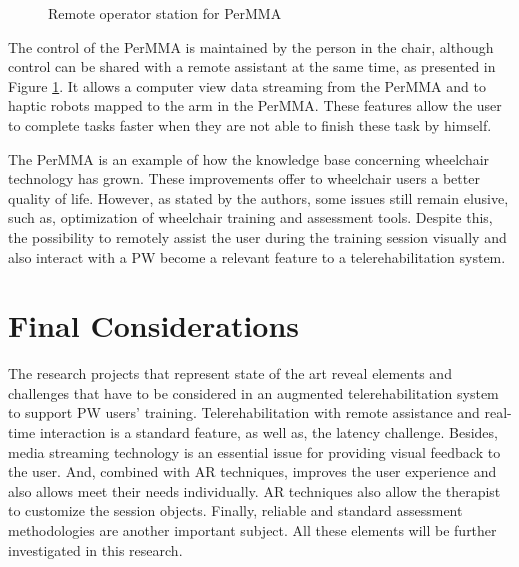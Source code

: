 \begin{figure}[!htbp]
\begin{minipage}{0.45\linewidth}
\caption{Remote operator station for PerMMA \cite{cooper2012}} \label{subfig:cooper2012-remoteOp}
\end{minipage}
\end{figure}

The control of the PerMMA is maintained by the person in the chair, although control can be shared with a remote assistant at the same time, as presented in Figure \ref{subfig:cooper2012-remoteOp}. It allows a computer view data streaming from the PerMMA and to haptic robots mapped to the arm in the PerMMA. These features allow the user to complete tasks faster when they are not able to finish these task by himself.


The PerMMA is an example of how the knowledge base concerning wheelchair technology has grown. These improvements offer to wheelchair users a better quality of life. However, as stated by the authors, some issues still remain elusive, such as, optimization of wheelchair training and assessment tools. Despite this,  the possibility to remotely assist the user during the training session visually and also interact with a PW become a relevant feature to a telerehabilitation system.

\section{Final Considerations}

The research projects that represent state of the art reveal elements and challenges that have to be considered in an augmented telerehabilitation system to support PW users' training. Telerehabilitation with remote assistance and real-time interaction is a standard feature, as well as, the latency challenge. Besides, media streaming technology is an essential issue for providing visual feedback to the user. And, combined with AR techniques, improves the user experience and also allows meet their needs individually. AR techniques also allow the therapist to customize the session objects. Finally, reliable and standard assessment methodologies are another important subject. All these elements will be further investigated in this research. 


